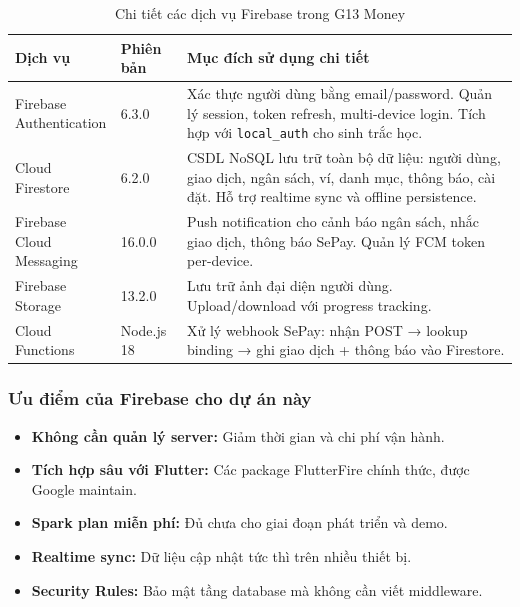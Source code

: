 \begin{table}[H]
\centering
\caption{Chi tiết các dịch vụ Firebase trong G13 Money}
\label{tab:firebase-detail}
\begin{tabularx}{\textwidth}{|l|l|X|}
\hline
\textbf{Dịch vụ} & \textbf{Phiên bản} & \textbf{Mục đích sử dụng chi tiết} \\
\hline
\makecell[l]{Firebase\\Authentication} & 6.3.0 & Xác thực người dùng bằng email/password. Quản lý session, token refresh, multi-device login. Tích hợp với \texttt{local\_auth} cho sinh trắc học. \\
\hline
\makecell[l]{Cloud\\Firestore} & 6.2.0 & CSDL NoSQL lưu trữ toàn bộ dữ liệu: người dùng, giao dịch, ngân sách, ví, danh mục, thông báo, cài đặt. Hỗ trợ realtime sync và offline persistence. \\
\hline
\makecell[l]{Firebase Cloud\\Messaging} & 16.0.0 & Push notification cho cảnh báo ngân sách, nhắc giao dịch, thông báo SePay. Quản lý FCM token per-device. \\
\hline
\makecell[l]{Firebase\\Storage} & 13.2.0 & Lưu trữ ảnh đại diện người dùng. Upload/download với progress tracking. \\
\hline
\makecell[l]{Cloud\\Functions} & Node.js 18 & Xử lý webhook SePay: nhận POST → lookup binding → ghi giao dịch + thông báo vào Firestore. \\
\hline
\end{tabularx}
\end{table}

\subsubsection{Ưu điểm của Firebase cho dự án này}

\begin{itemize}
  \item \textbf{Không cần quản lý server:} Giảm thời gian và chi phí vận hành.
  \item \textbf{Tích hợp sâu với Flutter:} Các package FlutterFire chính thức, được Google maintain.
  \item \textbf{Spark plan miễn phí:} Đủ chưa cho giai đoạn phát triển và demo.
  \item \textbf{Realtime sync:} Dữ liệu cập nhật tức thì trên nhiều thiết bị.
  \item \textbf{Security Rules:} Bảo mật tầng database mà không cần viết middleware.
\end{itemize}

